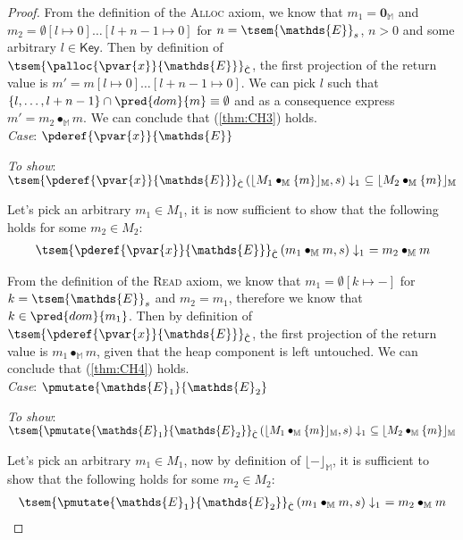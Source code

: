 {\begin{proof}
From the definition of the \textsc{Alloc} axiom, we know that $m_1 = \mathbf{0}_\mathbb{M}$ and $m_2 = \emptyset[l \mapsto 0]\ldots[l + n - 1 \mapsto 0]$ for $n = \tsem{\mathds{E}}_s$, $n > 0$ and some arbitrary $l \in \mathsf{Key}$. Then by definition of $\tsem{\palloc{\pvar{x}}{\mathds{E}}}_{\hat{\mathsf{C}}}$, the first projection of the return value is $m' = m[l \mapsto 0]\ldots[l + n - 1 \mapsto 0]$. We can pick $l$ such that $\{ l, \ldots, l + n -1 \} \cap \pred{dom}{m} \equiv \emptyset$ and as a consequence express $m' = m_2 \bullet_\mathbb{M} m$. We can conclude that (\ref{thm:CH3}) holds. \\

\textit{Case}: $\pderef{\pvar{x}}{\mathds{E}}$

\textit{To show}: $\tsem{\pderef{\pvar{x}}{\mathds{E}}}_{\hat{\mathsf{C}}} \left( \lfloor M_1 \bullet_\mathbb{M} \{m\} \rfloor_\mathbb{M}, s \right) \downarrow_1\ \subseteq \lfloor M_2 \bullet_\mathbb{M} \{m\} \rfloor_\mathbb{M}$

Let's pick an arbitrary $m_1 \in M_1$, it is now sufficient to show that the following holds for some $m_2 \in M_2$:
\begin{gather}
	\label{thm:CH4} \tsem{\pderef{\pvar{x}}{\mathds{E}}}_{\hat{\mathsf{C}}} \left( m_1 \bullet_\mathbb{M} m, s \right) \downarrow_1\ = m_2 \bullet_\mathbb{M} m
\end{gather}

From the definition of the \textsc{Read} axiom, we know that $m_1 = \emptyset[k \mapsto -]$ for $k = \tsem{\mathds{E}}_s$ and $m_2 = m_1$, therefore we know that $k \in \pred{dom}{m_1}$. Then by definition of $\tsem{\pderef{\pvar{x}}{\mathds{E}}}_{\hat{\mathsf{C}}}$, the first projection of the return value is $m_1 \bullet_\mathbb{M} m$, given that the heap component is left untouched. We can conclude that (\ref{thm:CH4}) holds. \\

\textit{Case}: $\pmutate{\mathds{E}_1}{\mathds{E}_2}$

\textit{To show}: $\tsem{\pmutate{\mathds{E}_1}{\mathds{E}_2}}_{\hat{\mathsf{C}}} \left( \lfloor M_1 \bullet_\mathbb{M} \{m\} \rfloor_\mathbb{M}, s \right) \downarrow_1\ \subseteq \lfloor M_2 \bullet_\mathbb{M} \{m\} \rfloor_\mathbb{M}$

Let's pick an arbitrary $m_1 \in M_1$, now by definition of $\lfloor - \rfloor_\mathbb{M}$, it is sufficient to show that the following holds for some $m_2 \in M_2$:
\begin{gather}
	\label{thm:CH5} \tsem{\pmutate{\mathds{E}_1}{\mathds{E}_2}}_{\hat{\mathsf{C}}} \left( m_1 \bullet_\mathbb{M} m, s \right) \downarrow_1\ = m_2 \bullet_\mathbb{M} m
\end{gather}


\end{proof}}
